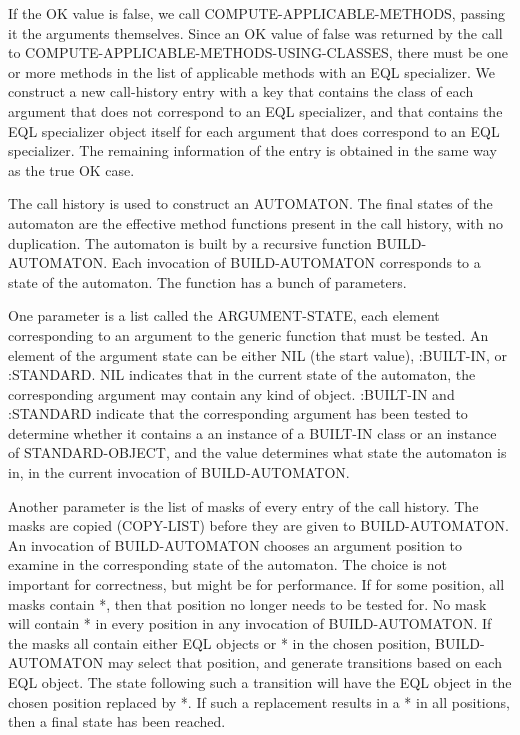 If the OK value is false, we call COMPUTE-APPLICABLE-METHODS, passing
it the arguments themselves.  Since an OK value of false was returned
by the call to COMPUTE-APPLICABLE-METHODS-USING-CLASSES, there must be
one or more methods in the list of applicable methods with an EQL
specializer.  We construct a new call-history entry with a key that
contains the class of each argument that does not correspond to an EQL
specializer, and that contains the EQL specializer object itself for
each argument that does correspond to an EQL specializer.  The
remaining information of the entry is obtained in the same way as the
true OK case.

The call history is used to construct an AUTOMATON.  The final states
of the automaton are the effective method functions present in the
call history, with no duplication.  The automaton is built by a
recursive function BUILD-AUTOMATON.  Each invocation of
BUILD-AUTOMATON corresponds to a state of the automaton.  The function
has a bunch of parameters.

One parameter is a list called the ARGUMENT-STATE, each element
corresponding to an argument to the generic function that must be
tested.  An element of the argument state can be either NIL (the start
value), :BUILT-IN, or :STANDARD.  NIL indicates that in the current
state of the automaton, the corresponding argument may contain any
kind of object.  :BUILT-IN and :STANDARD indicate that the
corresponding argument has been tested to determine whether it
contains a an instance of a BUILT-IN class or an instance of
STANDARD-OBJECT, and the value determines what state the automaton is
in, in the current invocation of BUILD-AUTOMATON.

Another parameter is the list of masks of every entry of the call
history.  The masks are copied (COPY-LIST) before they are given to
BUILD-AUTOMATON.  An invocation of BUILD-AUTOMATON chooses an argument
position to examine in the corresponding state of the automaton.  The
choice is not important for correctness, but might be for performance.
If for some position, all masks contain *, then that position no
longer needs to be tested for.  No mask will contain * in every
position in any invocation of BUILD-AUTOMATON.  If the masks all
contain either EQL objects or * in the chosen position,
BUILD-AUTOMATON may select that position, and generate transitions
based on each EQL object.  The state following such a transition will
have the EQL object in the chosen position replaced by *.  If such a
replacement results in a * in all positions, then a final state has
been reached.  
